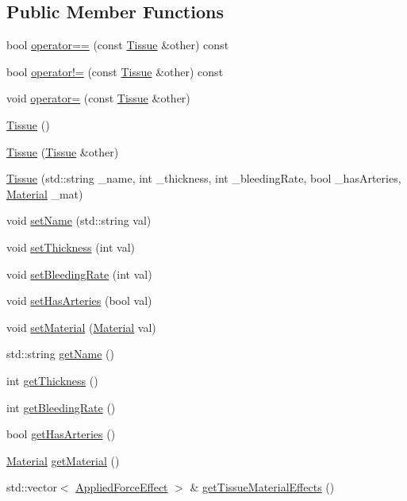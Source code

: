 \subsection*{Public Member Functions}
\begin{DoxyCompactItemize}
\item 
bool \mbox{\hyperlink{class_tissue_a7c22bbf06c50006c5e21b7066da55f38}{operator==}} (const \mbox{\hyperlink{class_tissue}{Tissue}} \&other) const
\item 
bool \mbox{\hyperlink{class_tissue_aa0ca0885c74788d123d7b5406f695fe5}{operator!=}} (const \mbox{\hyperlink{class_tissue}{Tissue}} \&other) const
\item 
void \mbox{\hyperlink{class_tissue_a5982c346b12cd55c6dbe5114eea8d3f3}{operator=}} (const \mbox{\hyperlink{class_tissue}{Tissue}} \&other)
\item 
\mbox{\hyperlink{class_tissue_a8f46af4ca215ac9e799fa42b419a5ce9}{Tissue}} ()
\item 
\mbox{\hyperlink{class_tissue_a16e3bb6ef9c3f04507a3b1f28da5d283}{Tissue}} (\mbox{\hyperlink{class_tissue}{Tissue}} \&other)
\item 
\mbox{\hyperlink{class_tissue_a5a8ebbf389afa45e53a846fa2e638ea9}{Tissue}} (std\+::string \+\_\+name, int \+\_\+thickness, int \+\_\+bleeding\+Rate, bool \+\_\+has\+Arteries, \mbox{\hyperlink{class_material}{Material}} \+\_\+mat)
\item 
void \mbox{\hyperlink{class_tissue_a51042a2da532a76d25f389158c2c1f8e}{set\+Name}} (std\+::string val)
\item 
void \mbox{\hyperlink{class_tissue_a994a329bdb0daadd02a7050c2782daf6}{set\+Thickness}} (int val)
\item 
void \mbox{\hyperlink{class_tissue_aeeea87a0b266ab1690457fe3b6b8d673}{set\+Bleeding\+Rate}} (int val)
\item 
void \mbox{\hyperlink{class_tissue_aa15728a4d8edba81f92980697e575f69}{set\+Has\+Arteries}} (bool val)
\item 
void \mbox{\hyperlink{class_tissue_a822541fae1ec254c2e370f5cd8c922cd}{set\+Material}} (\mbox{\hyperlink{class_material}{Material}} val)
\item 
std\+::string \mbox{\hyperlink{class_tissue_a0c0972433998857befee73dbf1fedf31}{get\+Name}} ()
\item 
int \mbox{\hyperlink{class_tissue_a200a50df2fcb4474987575f22403a4c3}{get\+Thickness}} ()
\item 
int \mbox{\hyperlink{class_tissue_a7748299a10804751740a36797bee74c3}{get\+Bleeding\+Rate}} ()
\item 
bool \mbox{\hyperlink{class_tissue_afb6756f17cfc812b4d2b99a12a0efacb}{get\+Has\+Arteries}} ()
\item 
\mbox{\hyperlink{class_material}{Material}} \mbox{\hyperlink{class_tissue_a07bb83918c0e9bc36ade236971f0436e}{get\+Material}} ()
\item 
std\+::vector$<$ \mbox{\hyperlink{struct_applied_force_effect}{Applied\+Force\+Effect}} $>$ \& \mbox{\hyperlink{class_tissue_a28cafce7378e40c702e63f342e6b37b2}{get\+Tissue\+Material\+Effects}} ()
\end{DoxyCompactItemize}
